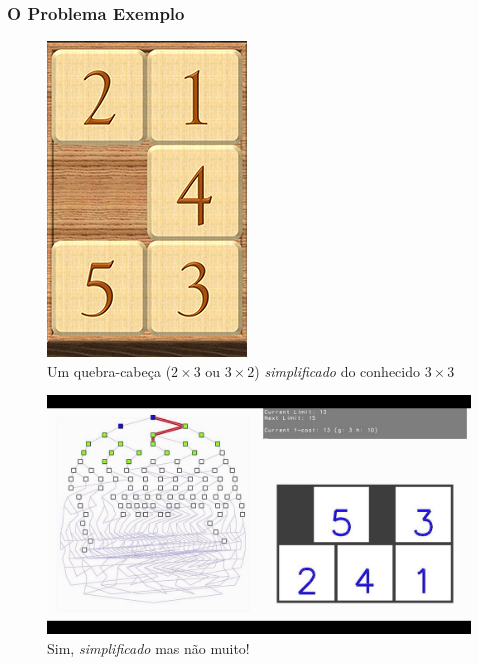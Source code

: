 \begin{frame}[fragile, allowframebreaks=0.9]
  \frametitle{O Problema Exemplo}

\begin{figure}[!htb]
\centering
\includegraphics[width=.5\textwidth, height=0.40\textheight]{figures/puzzle_2x3_01.jpg}
\caption{Um quebra-cabeça ($2\times 3$ ou $3\times 2$) \textit{simplificado} do conhecido $3\times 3$}
\end{figure}


\framebreak
\begin{figure}[!htb]
\centering
\includegraphics[width=.75\textwidth, height=0.65\textheight]{figures/puzzle_2x3_02.jpg}
\caption{Sim, \textit{simplificado} mas não muito!}
\end{figure}

\end{frame}

